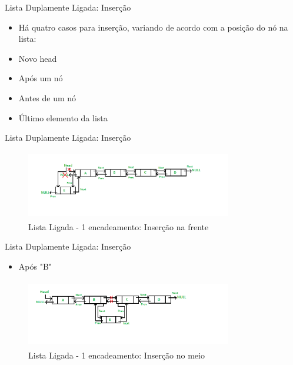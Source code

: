 \begin{frame}
	\begin{block}{Lista Duplamente Ligada: Inserção}
	\begin{itemize}
			\item Há quatro casos para inserção, variando de acordo com a posição do nó na lista: 

			\item Novo head 
			
			\item Após um nó
			
			\item Antes de um nó
			
			\item Último elemento da lista
		\end{itemize}
	\end{block}
\end{frame}



\begin{frame}
	\begin{block}{Lista Duplamente Ligada: Inserção}
		\begin{figure}[!htb]
			\centering	  				
			\includegraphics[height=3cm, width = 9cm]{./pic/DLL_add_front1.png}
			\caption{Lista Ligada - 1 encadeamento: Inserção na frente \cite{GEEKS_2018}}
			\label{fig_LDE_front}
		\end{figure}
	\end{block}
\end{frame}


\begin{frame}
	\begin{block}{Lista Duplamente Ligada: Inserção}
	\begin{itemize}
			\item Após "B"
	\end{itemize}
		\begin{figure}[!htb]
			\centering	  				
			\includegraphics[height=3cm, width = 9cm]{./pic/DLL_add_middle1.png}
			\caption{Lista Ligada - 1 encadeamento: Inserção no meio \cite{GEEKS_2018}}
			\label{fig_LDE_midle1}
		\end{figure}
	\end{block}
\end{frame}


